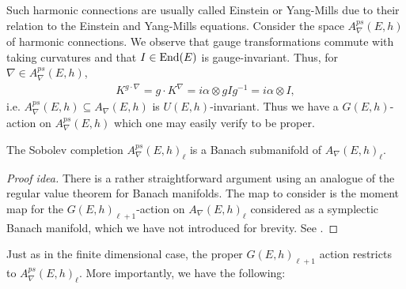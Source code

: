 \documentclass[12pt]{ociamthesis}  %
\begin{document}
Such harmonic connections are usually called Einstein or Yang-Mills
due to their relation to the Einstein and Yang-Mills equations.
Consider the space $A_\nabla^{ps}(E,h)$ of harmonic connections.
We observe that gauge transformations commute with taking curvatures and
that $I\in\operatorname{End}(E)$ is gauge-invariant. Thus, for $\nabla\in A_\nabla^{ps}(E,h)$,
\begin{align*}
  K^{g\cdot\nabla}
  = g\cdot K^\nabla
  = i\alpha\otimes gIg^{-1}
  = i\alpha\otimes I,
\end{align*}
i.e. $A_\nabla^{ps}(E,h)\subseteq A_\nabla(E,h)$ is $U(E,h)$-invariant.
Thus we have a $G(E,h)$-action on $A^{ps}_\nabla(E,h)$ which
one may easily verify to be proper.

\begin{lemma}
  The Sobolev completion $A^{ps}_\nabla(E,h)_\ell$ is a
  Banach submanifold of $A_\nabla(E,h)_\ell$.
  \begin{proof}[Proof idea]
    There is a rather straightforward argument using an analogue
    of the regular value theorem for Banach manifolds. The map
    to consider is the moment map for the $G(E,h)_{\ell+1}$-action
    on $A_\nabla(E,h)_\ell$ considered as a symplectic
    Banach manifold, which we have not introduced for brevity.
    See \cite[Proposition 5.8]{neitzke2021}.
  \end{proof}
\end{lemma}
Just as in the finite dimensional case, the proper $G(E,h)_{\ell+1}$
action restricts to $A^{ps}_\nabla(E,h)_\ell$.
More importantly, we have the following:
\end{document}
